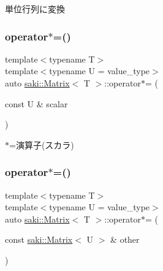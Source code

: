 単位行列に変換 

\mbox{\label{classsaki_1_1_matrix_aae1ffee9f67e7c9893a2329c75bd8a51}} 
\subsubsection{\texorpdfstring{operator$\ast$=()}{operator*=()}\hspace{0.1cm}{\footnotesize\ttfamily [1/2]}}
{\footnotesize\ttfamily template$<$typename T$>$ \\
template$<$typename U  = value\+\_\+type$>$ \\
auto \mbox{\hyperlink{classsaki_1_1_matrix}{saki\+::\+Matrix}}$<$ T $>$\+::operator$\ast$= (\begin{DoxyParamCaption}\item[{const U \&}]{scalar }\end{DoxyParamCaption})\hspace{0.3cm}{\ttfamily [inline]}}



$\ast$=演算子(スカラ) 

\mbox{\label{classsaki_1_1_matrix_af76500609a5175d39f9359e989401e71}} 
\subsubsection{\texorpdfstring{operator$\ast$=()}{operator*=()}\hspace{0.1cm}{\footnotesize\ttfamily [2/2]}}
{\footnotesize\ttfamily template$<$typename T$>$ \\
template$<$typename U  = value\+\_\+type$>$ \\
auto \mbox{\hyperlink{classsaki_1_1_matrix}{saki\+::\+Matrix}}$<$ T $>$\+::operator$\ast$= (\begin{DoxyParamCaption}\item[{const \mbox{\hyperlink{classsaki_1_1_matrix}{saki\+::\+Matrix}}$<$ U $>$ \&}]{other }\end{DoxyParamCaption})\hspace{0.3cm}{\ttfamily [inline]}}



